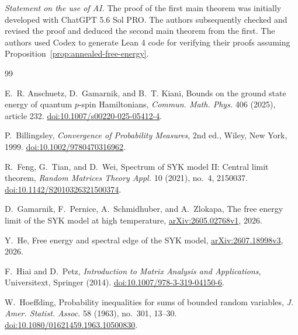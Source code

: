 \documentclass[11pt]{article}
\theoremstyle{remark}
\begin{document}




\medskip
\noindent\emph{Statement on the use of AI.}
The proof of the first main theorem was initially developed with ChatGPT
5.6 Sol PRO. The authors subsequently checked and revised the proof and
deduced the second main theorem from the first. The authors used Codex to generate Lean 4 code for verifying their proofs assuming Proposition~\ref{prop:annealed-free-energy}.
\begin{thebibliography}{99}

E.~R. Anschuetz, D.~Gamarnik, and B.~T. Kiani,
\newblock Bounds on the ground state energy of quantum $p$-spin Hamiltonians,
\newblock \emph{Commun. Math. Phys.} 406 (2025), article 232.
\newblock \href{https://doi.org/10.1007/s00220-025-05412-4}
{doi:10.1007/s00220-025-05412-4}.



P.~Billingsley,
\newblock \emph{Convergence of Probability Measures},
\newblock 2nd ed., Wiley, New York, 1999.
\newblock \href{https://doi.org/10.1002/9780470316962}
{doi:10.1002/9780470316962}.

R.~Feng, G.~Tian, and D.~Wei,
\newblock Spectrum of SYK model II: Central limit theorem,
\newblock \emph{Random Matrices Theory Appl.} 10 (2021), no.~4, 2150037.
\newblock \href{https://doi.org/10.1142/S2010326321500374}
{doi:10.1142/S2010326321500374}.

D.~Gamarnik, F.~Pernice, A.~Schmidhuber, and A.~Zlokapa,
\newblock The free energy limit of the SYK model at high temperature,
\newblock \href{https://arxiv.org/abs/2605.02768}
{arXiv:2605.02768v1}, 2026.

Y.~He,
\newblock Free energy and spectral edge of the SYK model,
\newblock \href{https://arxiv.org/abs/2607.18998}
{arXiv:2607.18998v3}, 2026.


F.~Hiai and D.~Petz,
\newblock \emph{Introduction to Matrix Analysis and Applications},
\newblock Universitext, Springer (2014).
\newblock \href{https://doi.org/10.1007/978-3-319-04150-6}
{doi:10.1007/978-3-319-04150-6}.

W.~Hoeffding,
\newblock Probability inequalities for sums of bounded random variables,
\newblock \emph{J. Amer. Statist. Assoc.} 58 (1963), no.~301, 13--30.
\newblock \href{https://doi.org/10.1080/01621459.1963.10500830}
{doi:10.1080/01621459.1963.10500830}.



\end{thebibliography}
\end{document}
